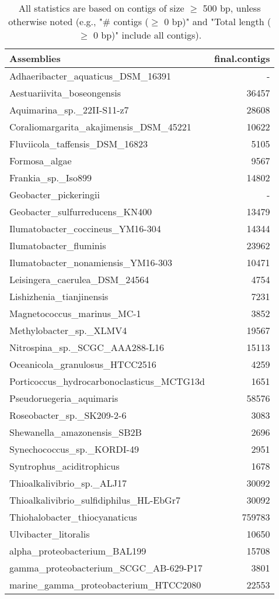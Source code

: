 \documentclass[12pt,a4paper]{article}
\begin{document}
\begin{table}[ht]
\begin{center}
\caption{All statistics are based on contigs of size $\geq$ 500 bp, unless otherwise noted (e.g., "\# contigs ($\geq$ 0 bp)" and "Total length ($\geq$ 0 bp)" include all contigs).}
\begin{tabular}{|l*{1}{|r}|}
\hline
Assemblies & final.contigs \\ \hline
Adhaeribacter\_aquaticus\_DSM\_16391 & - \\ \hline
Aestuariivita\_boseongensis & 36457 \\ \hline
Aquimarina\_sp.\_22II-S11-z7 & 28608 \\ \hline
Coraliomargarita\_akajimensis\_DSM\_45221 & 10622 \\ \hline
Fluviicola\_taffensis\_DSM\_16823 & 5105 \\ \hline
Formosa\_algae & 9567 \\ \hline
Frankia\_sp.\_Iso899 & 14802 \\ \hline
Geobacter\_pickeringii & - \\ \hline
Geobacter\_sulfurreducens\_KN400 & 13479 \\ \hline
Ilumatobacter\_coccineus\_YM16-304 & 14344 \\ \hline
Ilumatobacter\_fluminis & 23962 \\ \hline
Ilumatobacter\_nonamiensis\_YM16-303 & 10471 \\ \hline
Leisingera\_caerulea\_DSM\_24564 & 4754 \\ \hline
Lishizhenia\_tianjinensis & 7231 \\ \hline
Magnetococcus\_marinus\_MC-1 & 3852 \\ \hline
Methylobacter\_sp.\_XLMV4 & 19567 \\ \hline
Nitrospina\_sp.\_SCGC\_AAA288-L16 & 15113 \\ \hline
Oceanicola\_granulosus\_HTCC2516 & 4259 \\ \hline
Porticoccus\_hydrocarbonoclasticus\_MCTG13d & 1651 \\ \hline
Pseudoruegeria\_aquimaris & 58576 \\ \hline
Roseobacter\_sp.\_SK209-2-6 & 3083 \\ \hline
Shewanella\_amazonensis\_SB2B & 2696 \\ \hline
Synechococcus\_sp.\_KORDI-49 & 2951 \\ \hline
Syntrophus\_aciditrophicus & 1678 \\ \hline
Thioalkalivibrio\_sp.\_ALJ17 & 30092 \\ \hline
Thioalkalivibrio\_sulfidiphilus\_HL-EbGr7 & 30092 \\ \hline
Thiohalobacter\_thiocyanaticus & 759783 \\ \hline
Ulvibacter\_litoralis & 10650 \\ \hline
alpha\_proteobacterium\_BAL199 & 15708 \\ \hline
gamma\_proteobacterium\_SCGC\_AB-629-P17 & 3801 \\ \hline
marine\_gamma\_proteobacterium\_HTCC2080 & 22553 \\ \hline
\end{tabular}
\end{center}
\end{table}
\end{document}
